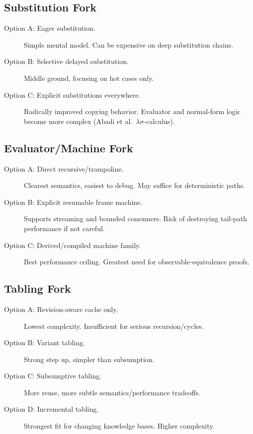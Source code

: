 \documentclass[11pt]{article}
\begin{document}
\subsection{Substitution Fork}

\begin{description}
\item[Option A: Eager substitution.]
  Simple mental model.  Can be expensive on deep substitution chains.
\item[Option B: Selective delayed substitution.]
  Middle ground, focusing on hot cases only.
\item[Option C: Explicit substitutions everywhere.]
  Radically improved copying behavior.  Evaluator and normal-form logic
  become more complex (Abadi et al.\ $\lambda\sigma$-calculus).
\end{description}

\subsection{Evaluator/Machine Fork}

\begin{description}
\item[Option A: Direct recursive/trampoline.]
  Clearest semantics, easiest to debug.  May suffice for deterministic paths.
\item[Option B: Explicit resumable frame machine.]
  Supports streaming and bounded consumers.  Risk of destroying tail-path
  performance if not careful.
\item[Option C: Derived/compiled machine family.]
  Best performance ceiling.  Greatest need for observable-equivalence proofs.
\end{description}

\subsection{Tabling Fork}

\begin{description}
\item[Option A: Revision-aware cache only.]
  Lowest complexity.  Insufficient for serious recursion/cycles.
\item[Option B: Variant tabling.]
  Strong step up, simpler than subsumption.
\item[Option C: Subsumptive tabling.]
  More reuse, more subtle semantics/performance tradeoffs.
\item[Option D: Incremental tabling.]
  Strongest fit for changing knowledge bases.  Higher complexity.
\end{description}
\end{document}
